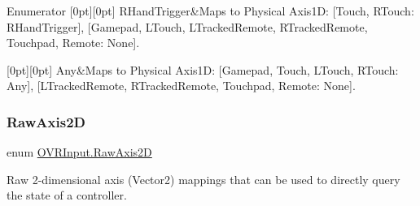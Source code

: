 \begin{DoxyEnumFields}{Enumerator}
[0pt][0pt]{}\mbox{\label{class_o_v_r_input_a9c9eff2910ca07d1fb0e924273ebefafa2d5b73bea84840ebcd86393266fb601d}} 
R\+Hand\+Trigger&Maps to Physical Axis1D\+: \mbox{[}Touch, R\+Touch\+: R\+Hand\+Trigger\mbox{]}, \mbox{[}Gamepad, L\+Touch, L\+Tracked\+Remote, R\+Tracked\+Remote, Touchpad, Remote\+: None\mbox{]}. \\
\hline

[0pt][0pt]{}\mbox{\label{class_o_v_r_input_a9c9eff2910ca07d1fb0e924273ebefafaed36a1ef76a59ee3f15180e0441188ad}} 
Any&Maps to Physical Axis1D\+: \mbox{[}Gamepad, Touch, L\+Touch, R\+Touch\+: Any\mbox{]}, \mbox{[}L\+Tracked\+Remote, R\+Tracked\+Remote, Touchpad, Remote\+: None\mbox{]}. \\
\hline

\end{DoxyEnumFields}
\mbox{\label{class_o_v_r_input_a973c161bfb3bd6d0cc16c3a0b56c9f4a}} 
\subsubsection{\texorpdfstring{Raw\+Axis2D}{RawAxis2D}}
{\footnotesize\ttfamily enum \mbox{\hyperlink{class_o_v_r_input_a973c161bfb3bd6d0cc16c3a0b56c9f4a}{O\+V\+R\+Input.\+Raw\+Axis2D}}\hspace{0.3cm}{\ttfamily [strong]}}



Raw 2-\/dimensional axis (Vector2) mappings that can be used to directly query the state of a controller. 

